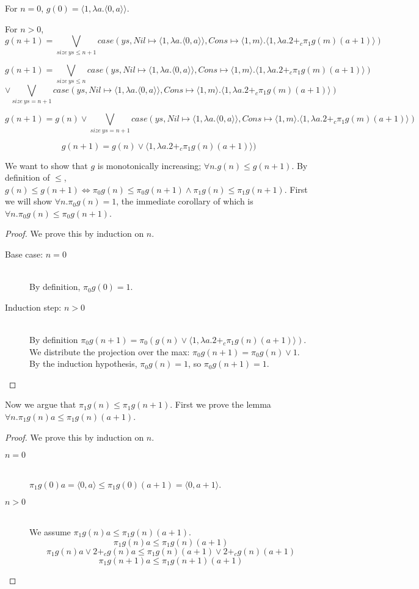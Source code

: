 For $n=0$, $g(0) = \langle 1,\lambda a.\langle 0,a\rangle\rangle$.

For $n>0$,
\[g(n+1) = \bigvee_{size\ ys \leq n+1} case(ys, Nil \mapsto \langle1,\lambda a.\langle 0,a\rangle\rangle, Cons \mapsto \langle 1,m \rangle.\langle 1, \lambda a. 2 +_c \pi_1g(m) (a+1)\rangle)\]

\[ g(n+1) = \bigvee_{size\ ys \leq n} case(ys, Nil \mapsto \langle1,\lambda a.\langle 0,a\rangle\rangle, Cons \mapsto \langle 1,m \rangle.\langle 1, \lambda a. 2 +_c \pi_1g(m) (a+1)\rangle) \]
\[ \vee \bigvee_{size\ ys = n+1} case(ys, Nil \mapsto \langle1,\lambda a.\langle 0,a\rangle\rangle, Cons \mapsto \langle 1,m \rangle.\langle 1, \lambda a. 2 +_c \pi_1g(m) (a+1)\rangle) \]
 
\[ g(n+1) = g(n) \vee \bigvee_{size\ ys = n+1} case(ys, Nil \mapsto \langle1,\lambda a.\langle 0,a\rangle\rangle, Cons \mapsto \langle 1,m \rangle.\langle 1, \lambda a. 2 +_c \pi_1g(m) (a+1)\rangle) \]

\[ g(n+1) = g(n) \vee \langle 1, \lambda a. 2 +_c \pi_1g(n) (a+1)\rangle)\]

We want to show that $g$ is monotonically increasing; $\forall n.g(n) \leq g(n+1)$.
By definition of $\leq$, $g(n) \leq g(n+1) \Leftrightarrow \pi_0 g(n) \leq \pi_0 g(n+1) \land \pi_1 g(n) \leq \pi_1 g(n+1)$.
First we will show $\forall n. \pi_0 g(n) = 1$, the immediate corollary of which is $\forall n. \pi_0 g(n) \leq \pi_0 g(n+1)$.
\begin{proof}
We prove this by induction on $n$.
  \begin{description}
    \item[Base case: $n=0$]\hfill \\
      By definition, $\pi_0 g(0) = 1$.
    \item[Induction step: $n>0$]\hfill \\
      By definition $\pi_0 g(n+1) = \pi_0 (g(n) \vee \langle 1, \lambda a. 2 +_c \pi_1g(n) (a+1)\rangle)$.
      We distribute the projection over the max: $\pi_0 g(n+1) = \pi_0 g(n) \vee 1$.
      By the induction hypothesis, $\pi_0 g(n) = 1$, so $\pi_0 g(n+1) = 1$.
  \end{description}
\end{proof}
Now we argue that $\pi_1g(n) \leq \pi_1 g(n+1)$.
First we prove the lemma $\forall n.\pi_1 g(n) a \leq \pi_1 g(n) (a+1)$.
\begin{proof}
  We prove this by induction on $n$.
  \begin{description}
    \item[$n=0$]\hfill \\
      $\pi_1 g(0) a = \langle 0,a\rangle \leq \pi_1 g(0) (a+1) = \langle 0,a+1 \rangle$.
    \item[$n>0$]\hfill \\
      We assume $\pi_1 g(n) a \leq \pi_1 g(n) (a+1)$.
      \[ \pi_1 g(n) a \leq \pi_1 g(n) (a+1) \]
      \[ \pi_1 g(n) a \vee 2 +_c g(n) a \leq \pi_1 g(n) (a+1) \vee 2 +_c g(n) (a+1) \]
      \[ \pi_1 g(n+1) a \leq \pi_1 g(n+1) (a+1) \]
  \end{description}
\end{proof}


